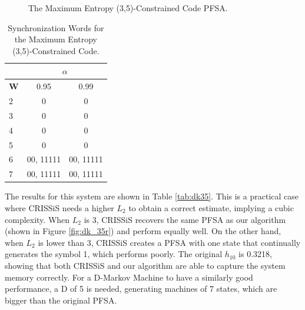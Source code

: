 {\begin{figure}
\centering
{}
\caption{The Maximum Entropy (3,5)-Constrained Code PFSA.\label{fig:dk_35}}
\end{figure}

\begin{table}
\centering
\caption{Synchronization Words for the Maximum Entropy (3,5)-Constrained Code. \label{tab:dk35synch}}
\begin{tabular}{|l|c|c|}
\hline
 & \multicolumn{2}{c|}{\textbf{$\alpha$}}\\
 \hline
\textbf{W} & 0.95 & 0.99 \\
\hline
2 & 0 & 0 \\ 
3 & 0 & 0 \\ 
4 & 0 & 0 \\ 
5 & 0  & 0 \\
6 & 00, 11111  & 00, 11111 \\
7 & 00, 11111  & 00, 11111 \\
 \hline
\end{tabular}
\end{table}

The results for this system are shown in Table \ref{tab:dk35}. This is a practical case where CRISSiS needs a higher $L_2$ to obtain a correct estimate, implying a cubic complexity. When $L_2$ is 3, CRISSiS recovers the same PFSA as our algorithm (shown in Figure \ref{fig:dk_35r}) and perform equally well. On the other hand, when $L_2$ is lower than 3, CRISSiS creates a PFSA with one state that continually generates the symbol 1, which performs poorly. The original $h_{10}$ is 0.3218, showing that both CRISSiS and our algorithm are able to capture the system memory correctly. For a D-Markov Machine to have a similarly good performance, a D of 5 is needed, generating machines of 7 states, which are bigger than the original PFSA.

}
